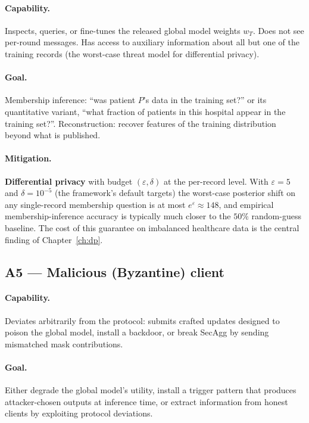 \documentclass[11pt,a4paper]{report}
\begin{document}
\paragraph{Capability.} Inspects, queries, or fine-tunes the released global
model weights $w_T$. Does not see per-round messages. Has access to
auxiliary information about all but one of the training records (the
worst-case threat model for differential privacy).

\paragraph{Goal.} Membership inference: ``was patient $P$'s data in the
training set?'' or its quantitative variant, ``what fraction of patients in
this hospital appear in the training set?''. Reconstruction: recover
features of the training distribution beyond what is published.

\paragraph{Mitigation.} \textbf{Differential privacy} with budget
$(\varepsilon, \delta)$ at the per-record level. With $\varepsilon = 5$ and
$\delta = 10^{-5}$ (the framework's default targets) the worst-case posterior
shift on any single-record membership question is at most $e^{\varepsilon}
\approx 148$, and empirical membership-inference accuracy is typically much
closer to the $50\%$ random-guess baseline. The cost of this guarantee on
imbalanced healthcare data is the central finding of Chapter~\ref{ch:dp}.

\subsection{A5 --- Malicious (Byzantine) client}

\paragraph{Capability.} Deviates arbitrarily from the protocol: submits
crafted updates designed to poison the global model, install a backdoor,
or break SecAgg by sending mismatched mask contributions.

\paragraph{Goal.} Either degrade the global model's utility, install a
trigger pattern that produces attacker-chosen outputs at inference time,
or extract information from honest clients by exploiting protocol
deviations.
\end{document}
